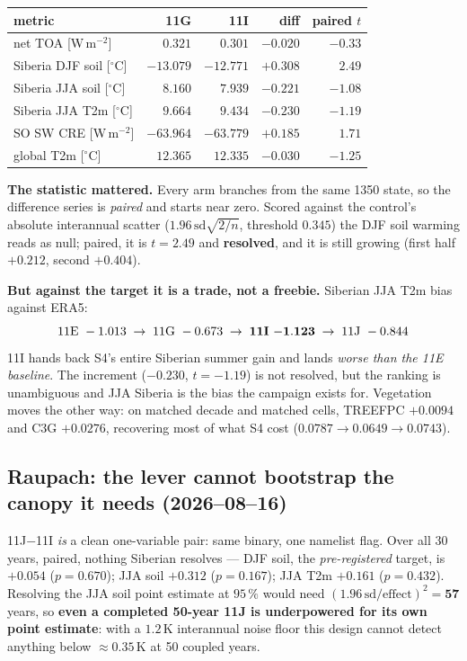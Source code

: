 \documentclass[10pt]{article}
\begin{document}
\begin{center}\footnotesize
\begin{tabular}{lrrrr}
\toprule
metric & 11G & 11I & diff & paired $t$ \\
\midrule
net TOA [W\,m$^{-2}$]        & $0.321$   & $0.301$   & $-0.020$ & $-0.33$ \\
Siberia DJF soil [$^\circ$C] & $-13.079$ & $-12.771$ & $\mathbf{+0.308}$ & $\mathbf{2.49}$ \\
Siberia JJA soil [$^\circ$C] & $8.160$   & $7.939$   & $-0.221$ & $-1.08$ \\
Siberia JJA T2m [$^\circ$C]  & $9.664$   & $9.434$   & $-0.230$ & $-1.19$ \\
SO SW CRE [W\,m$^{-2}$]      & $-63.964$ & $-63.779$ & $+0.185$ & $1.71$ \\
global T2m [$^\circ$C]       & $12.365$  & $12.335$  & $-0.030$ & $-1.25$ \\
\bottomrule
\end{tabular}
\end{center}

\textbf{The statistic mattered.} Every arm branches from the same 1350 state, so the
difference series is \emph{paired} and starts near zero. Scored against the control's
absolute interannual scatter ($1.96\,\mathrm{sd}\sqrt{2/n}$, threshold $0.345$) the DJF
soil warming reads as null; paired, it is $t=2.49$ and \textbf{resolved}, and it is still
growing (first half $+0.212$, second $+0.404$).

\textbf{But against the target it is a trade, not a freebie.} Siberian JJA T2m bias against
ERA5:
\[
\text{11E } -1.013 \;\to\; \text{11G } -0.673 \;\to\; \text{\textbf{11I} } \mathbf{-1.123}
\;\to\; \text{11J } -0.844
\]
11I hands back S4's entire Siberian summer gain and lands \emph{worse than the 11E
baseline}. The increment ($-0.230$, $t=-1.19$) is not resolved, but the ranking is
unambiguous and JJA Siberia is the bias the campaign exists for. Vegetation moves the other
way: on matched decade and matched cells, TREEFPC $+0.0094$ and C3G $+0.0276$, recovering
most of what S4 cost ($0.0787\to0.0649\to0.0743$).

\subsection{Raupach: the lever cannot bootstrap the canopy it needs
(2026--08--16)}\label{sub:r29raupach}
11J${-}$11I \emph{is} a clean one-variable pair: same binary, one namelist flag. Over all
$30$ years, paired, nothing Siberian resolves --- DJF soil, the \emph{pre-registered}
target, is $+0.054$ ($p=0.670$); JJA soil $+0.312$ ($p=0.167$); JJA T2m $+0.161$
($p=0.432$). Resolving the JJA soil point estimate at $95\,\%$ would need
$(1.96\,\mathrm{sd}/\mathrm{effect})^2 = \mathbf{57}$ years, so \textbf{even a completed
50-year 11J is underpowered for its own point estimate}: with a $1.2$\,K interannual noise
floor this design cannot detect anything below ${\approx}0.35$\,K at 50 coupled years.
\end{document}
